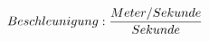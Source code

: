 \documentclass[preview]{standalone}
\begin{document}
\begin{align*}
\special{dvisvgm:raw <g id='unique000'>}Beschleunigung: \frac{Meter/Sekunde}{Sekunde}\special{dvisvgm:raw </g>}
\end{align*}
\end{document}
